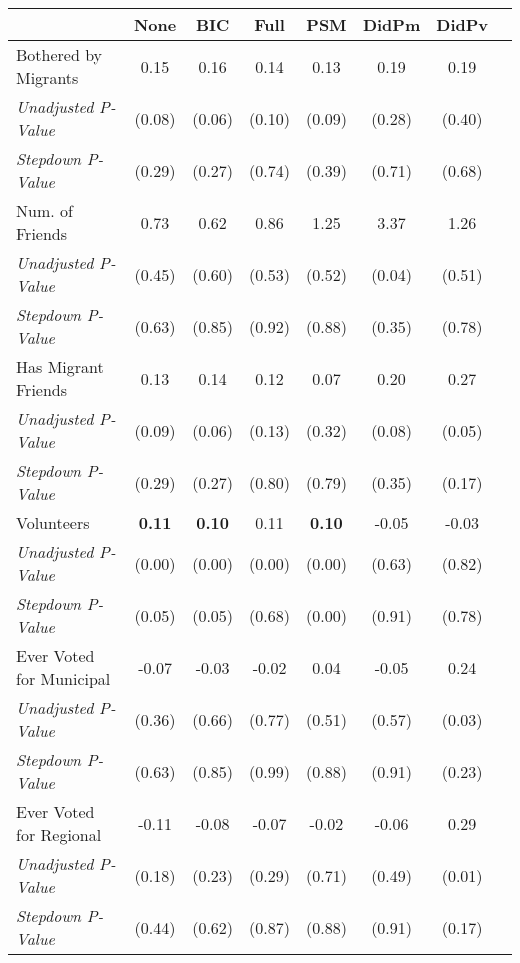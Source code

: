 \begin{tabular}{l c c c c c c c}
\toprule
 & None & BIC & Full & PSM & DidPm & DidPv \\
\midrule
Bothered by Migrants & 0.15 & 0.16 & 0.14 & 0.13 & 0.19 & 0.19 \\
\quad \textit{Unadjusted P-Value} & (0.08) & (0.06) & (0.10) & (0.09) & (0.28) & (0.40) \\
\quad \textit{Stepdown P-Value} & (0.29) & (0.27) & (0.74) & (0.39) & (0.71) & (0.68) \\
Num. of Friends & 0.73 & 0.62 & 0.86 & 1.25 & 3.37 & 1.26 \\
\quad \textit{Unadjusted P-Value} & (0.45) & (0.60) & (0.53) & (0.52) & (0.04) & (0.51) \\
\quad \textit{Stepdown P-Value} & (0.63) & (0.85) & (0.92) & (0.88) & (0.35) & (0.78) \\
Has Migrant Friends & 0.13 & 0.14 & 0.12 & 0.07 & 0.20 & 0.27 \\
\quad \textit{Unadjusted P-Value} & (0.09) & (0.06) & (0.13) & (0.32) & (0.08) & (0.05) \\
\quad \textit{Stepdown P-Value} & (0.29) & (0.27) & (0.80) & (0.79) & (0.35) & (0.17) \\
Volunteers & \textbf{ 0.11 } & \textbf{ 0.10 } & 0.11 & \textbf{ 0.10 } & -0.05 & -0.03 \\
\quad \textit{Unadjusted P-Value} & (0.00) & (0.00) & (0.00) & (0.00) & (0.63) & (0.82) \\
\quad \textit{Stepdown P-Value} & (0.05) & (0.05) & (0.68) & (0.00) & (0.91) & (0.78) \\
Ever Voted for Municipal & -0.07 & -0.03 & -0.02 & 0.04 & -0.05 & 0.24 \\
\quad \textit{Unadjusted P-Value} & (0.36) & (0.66) & (0.77) & (0.51) & (0.57) & (0.03) \\
\quad \textit{Stepdown P-Value} & (0.63) & (0.85) & (0.99) & (0.88) & (0.91) & (0.23) \\
Ever Voted for Regional & -0.11 & -0.08 & -0.07 & -0.02 & -0.06 & 0.29 \\
\quad \textit{Unadjusted P-Value} & (0.18) & (0.23) & (0.29) & (0.71) & (0.49) & (0.01) \\
\quad \textit{Stepdown P-Value} & (0.44) & (0.62) & (0.87) & (0.88) & (0.91) & (0.17) \\
\bottomrule
\end{tabular}
